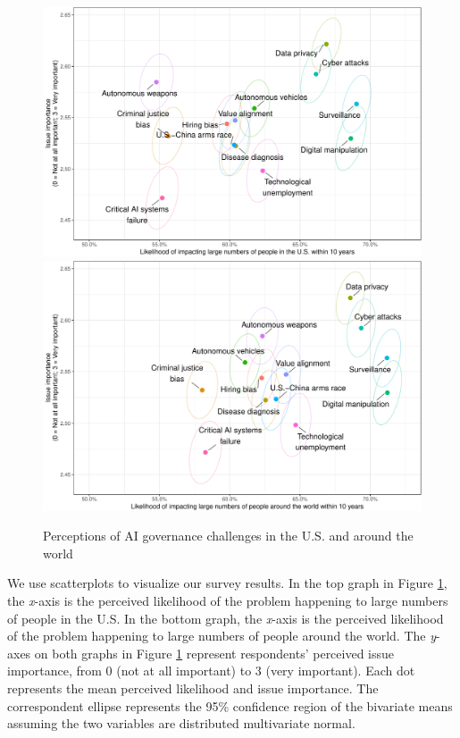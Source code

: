 \documentclass{article}
\begin{document}
\begin{figure}
\centering
\includegraphics[height=0.45\textheight]{images/airisksus-1.pdf} %
\includegraphics[height=0.45\textheight]{images/airisksworld-1.pdf}
\caption{Perceptions of AI governance challenges in the U.S. and around the world}
\label{fig:aigovchallenges}
\end{figure}

We use scatterplots to visualize our survey results. In the top graph in Figure \ref{fig:aigovchallenges}, the \emph{x}-axis is the perceived likelihood of the problem happening to large numbers of people in the U.S. In the bottom graph, the \emph{x}-axis is the perceived likelihood of the problem happening to large numbers of people around the world. The \emph{y}-axes on both graphs in Figure \ref{fig:aigovchallenges} represent respondents' perceived issue importance, from 0 (not at all important) to 3 (very important). Each dot represents the mean perceived likelihood and issue importance. The correspondent ellipse represents the 95\% confidence region of the bivariate means assuming the two variables are distributed multivariate normal.
\end{document}
